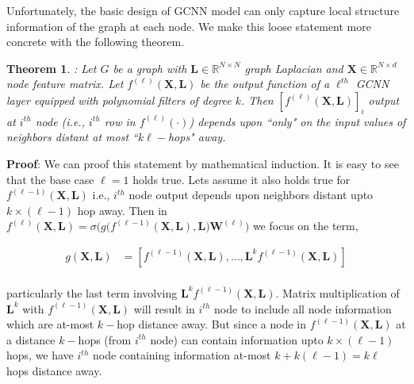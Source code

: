 \documentclass{article}
\newtheorem{theorem}{Theorem}
\begin{document}
Unfortunately, the basic design of GCNN model   can   only capture local structure information of the graph at each node. We make this loose statement more concrete with the following theorem.

\begin{theorem}\label{thm:k_hop_info}:
	\textit{Let  $G$ be a graph with $\mathbf{L}\in \mathbb{R}^{N \times N}$ graph Laplacian and $\mathbf{X}\in \mathbb{R}^{N \times d}$ node feature matrix. Let $f^{(\ell)}(\mathbf{X}, \mathbf{L})$ be the output function of a $\ell^{th}$  GCNN layer equipped with polynomial filters of degree $k$. Then $[f^{(\ell)}(\mathbf{X}, \mathbf{L})]_{i}$ output at $i^{th}$ node (i.e., $i^{th}$ row in $f^{(\ell)}(\cdot)$) depends upon ``only" on the   input values of  neighbors distant at most ``$k\ell-$hops" away.}\end{theorem}

\noindent\textbf{Proof}:  We can   proof this statement by mathematical induction. It is easy to see that the base case  $\ell=1$ holds true. Lets assume it also holds true for $f^{(\ell-1)}(\mathbf{X}, \mathbf{L})$ i.e., $i^{th}$ node output   depends upon neighbors distant upto $k\times (\ell-1)$ hop away. Then in  $f^{(\ell)}(\mathbf{X}, \mathbf{L})   = \sigma \Big( g\big(f^{(\ell-1)}(\mathbf{X}, \mathbf{L}), \mathbf{L}\big) \mathbf{W}^{(\ell)}\Big)$  we focus on the term,

\begin{equation}\label{eq:proof}
\begin{split}
g(\mathbf{X}, \mathbf{L}) & =[f^{(\ell-1)}(\mathbf{X}, \mathbf{L}), \dots, \mathbf{L}^{k}f^{(\ell-1)}(\mathbf{X}, \mathbf{L})] \\
\end{split}
\end{equation}

 particularly the last term involving $\mathbf{L}^{k}f^{(\ell-1)}(\mathbf{X}, \mathbf{L})$. Matrix multiplication of $\mathbf{L}^{k}$ with $f^{(\ell-1)}(\mathbf{X}, \mathbf{L})$   will result in $i^{th}$ node to include all node information which are at-most $k-$hop distance away. But since a node in $f^{(\ell-1)}(\mathbf{X}, \mathbf{L})$ at a distance $k-$hops (from $i^{th}$ node) can contain information upto $k\times (\ell-1)$ hops, we have $i^{th}$ node containing information at-most $k+k(\ell-1)=k\ell$ hops distance away. 
\end{document}
